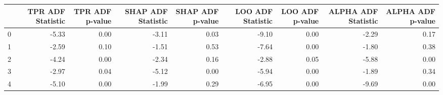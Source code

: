 \begin{tabular}{lrrrrrrrr}
\toprule
 & TPR ADF Statistic & TPR ADF p-value & SHAP ADF Statistic & SHAP ADF p-value & LOO ADF Statistic & LOO ADF p-value & ALPHA ADF Statistic & ALPHA ADF p-value \\
\midrule
0 & -5.33 & 0.00 & -3.11 & 0.03 & -9.10 & 0.00 & -2.29 & 0.17 \\
1 & -2.59 & 0.10 & -1.51 & 0.53 & -7.64 & 0.00 & -1.80 & 0.38 \\
2 & -4.24 & 0.00 & -2.34 & 0.16 & -2.88 & 0.05 & -5.88 & 0.00 \\
3 & -2.97 & 0.04 & -5.12 & 0.00 & -5.94 & 0.00 & -1.89 & 0.34 \\
4 & -5.10 & 0.00 & -1.99 & 0.29 & -6.95 & 0.00 & -9.69 & 0.00 \\
\bottomrule
\end{tabular}
